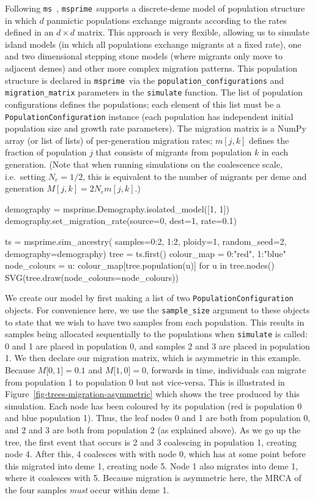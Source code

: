\documentclass[graybox]{svmult}
\newcommand{\msprime}[0]{\texttt{msprime}}
\newcommand{\ms}[0]{\texttt{ms}}
\begin{document}
Following \ms~\citep{hudson2002generating}, \msprime\ supports a
discrete-deme model of population structure in which
\(d\) panmictic populations exchange migrants according to the rates
defined in an \(d \times d\) matrix. This approach is very flexible,
allowing us to simulate island models (in which all populations exchange
migrants at a fixed rate), one and two dimensional stepping stone models
(where migrants only move to adjacent demes) and other more complex
migration patterns. This population structure is declared in \msprime\ via the
\texttt{population\_configurations} and \texttt{migration\_matrix}
parameters in the \texttt{simulate} function. The list of population
configurations defines the populations; each element of this list must
be a \texttt{PopulationConfiguration} instance (each population has
independent initial population size and growth rate parameters). The
migration matrix is a NumPy array (or list of lists) of per-generation
migration rates; \(m[j,k]\) defines the fraction of population \(j\)
that consists of migrants from population \(k\) in each generation. (Note that when running simulations on the coalescence scale, i.e.\ setting \(N_e=1/2\), this is equivalent to the number of migrants per deme and generation \(M[j,k]=2 N_e m[j,k]\).)

\begin{pythoncode}
demography =  msprime.Demography.isolated_model([1, 1])
demography.set_migration_rate(source=0, dest=1, rate=0.1)

ts  = msprime.sim_ancestry(
    samples={0:2, 1:2}, ploidy=1,
    random_seed=2, demography=demography)
tree = ts.first()
colour_map = {0:"red", 1:"blue"}
node_colours = {u: colour_map[tree.population(u)] for u in tree.nodes()}
SVG(tree.draw(node_colours=node_colours))
\end{pythoncode}

We create our model by first making a list of two
\texttt{PopulationConfiguration} objects. For convenience here, we use
the \texttt{sample\_size} argument to these objects to state that we
wish to have two samples from each population. This results in samples
being allocated sequentially to the populations when \texttt{simulate}
is called: 0 and 1 are placed in population 0, and samples 2 and 3 are
placed in population 1. We then declare our migration matrix, which is
asymmetric in this example. Because ${M{[}0,1{]} = 0.1}$ and
${M{[}1, 0{]} = 0}$, forwards in time, individuals can migrate
from population 1 to population 0 but not vice-versa. This is illustrated in
Figure~\ref{fig-trees-migration-asymmetric} which shows the tree
produced by this simulation. Each node has been coloured by its
population (red is population 0 and blue population 1). Thus, the leaf
nodes 0 and 1 are both from population 0, and 2 and 3 are both from
population 2 (as explained above). As we go up the tree, the first event
that occurs is 2 and 3 coalescing in population 1, creating node 4.
After this, 4 coalesces with with node 0, which has at some point before
this migrated into deme 1, creating node 5. Node 1 also migrates into
deme 1, where it coalesces with 5. Because migration is asymmetric here,
the MRCA of the four samples \emph{must} occur
within deme 1.
\end{document}
